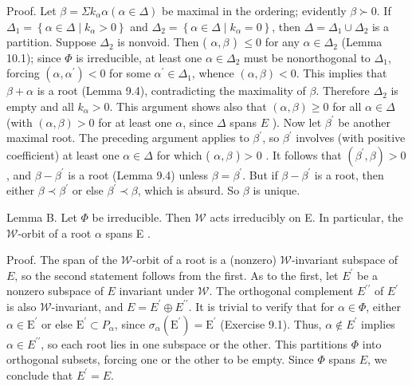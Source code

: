 \documentclass[10pt]{article}
\begin{document}
Proof. Let $\beta=\Sigma k_{\alpha} \alpha(\alpha \in \Delta)$ be maximal in the ordering; evidently $\beta \succ 0$. If $\Delta_{1}=\left\{\alpha \in \Delta \mid k_{\alpha}>0\right\}$ and $\Delta_{2}=\left\{\alpha \in \Delta \mid k_{\alpha}=0\right\}$, then $\Delta=\Delta_{1} \cup \Delta_{2}$ is a partition. Suppose $\Delta_{2}$ is nonvoid. Then ( $\alpha, \beta$ ) $\leq 0$ for any $\alpha \in \Delta_{2}$ (Lemma 10.1); since $\Phi$ is irreducible, at least one $\alpha \in \Delta_{2}$ must be nonorthogonal to $\Delta_{1}$, forcing $\left(\alpha, \alpha^{\prime}\right)<0$ for some $\alpha^{\prime} \in \Delta_{1}$, whence $(\alpha, \beta)<0$. This implies that $\beta+\alpha$ is a root (Lemma 9.4), contradicting the maximality of $\beta$. Therefore $\Delta_{2}$ is empty and all $k_{\alpha}>0$. This argument shows also that $(\alpha, \beta) \geq 0$ for all $\alpha \in \Delta$ (with $(\alpha, \beta)>0$ for at least one $\alpha$, since $\Delta$ spans $E$ ). Now let $\beta^{\prime}$ be another maximal root. The preceding argument applies to $\beta^{\prime}$, so $\beta^{\prime}$ involves (with positive coefficient) at least one $\alpha \in \Delta$ for which ( $\alpha, \beta$ ) > 0 . It follows that $\left(\beta^{\prime}, \beta\right)>0$, and $\beta-\beta^{\prime}$ is a root (Lemma 9.4) unless $\beta=\beta^{\prime}$. But if $\beta-\beta^{\prime}$ is a root, then either $\beta \prec \beta^{\prime}$ or else $\beta^{\prime} \prec \beta$, which is absurd. So $\beta$ is unique.

Lemma B. Let $\Phi$ be irreducible. Then $\mathscr{W}$ acts irreducibly on E. In particular, the $\mathscr{W}$-orbit of a root $\alpha$ spans E .

Proof. The span of the $\mathscr{W}$-orbit of a root is a (nonzero) $\mathscr{W}$-invariant subspace of $E$, so the second statement follows from the first. As to the first, let $E^{\prime}$ be a nonzero subspace of $E$ invariant under $\mathscr{W}$. The orthogonal complement $E^{\prime \prime}$ of $E^{\prime}$ is also $\mathscr{W}$-invariant, and $E=E^{\prime} \oplus E^{\prime \prime}$. It is trivial to verify that for $\alpha \in \Phi$, either $\alpha \in \mathrm{E}^{\prime}$ or else $\mathrm{E}^{\prime} \subset P_{\alpha}$, since $\sigma_{\alpha}\left(\mathrm{E}^{\prime}\right)=\mathrm{E}^{\prime}$ (Exercise 9.1). Thus, $\alpha \notin E^{\prime}$ implies $\alpha \in E^{\prime \prime}$, so each root lies in one subspace or the other. This partitions $\Phi$ into orthogonal subsets, forcing one or the other to be empty. Since $\Phi$ spans $E$, we conclude that $E^{\prime}=E$.
\end{document}
